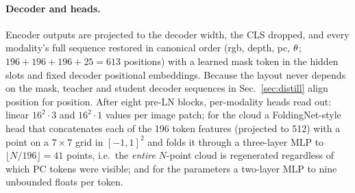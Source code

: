 \paragraph{Decoder and heads.}
Encoder outputs are projected to the decoder width, the CLS dropped, and every
modality's full sequence restored in canonical order (rgb, depth, pc, $\theta$;
$196{+}196{+}196{+}25=613$ positions) with a learned mask token in the hidden
slots and fixed decoder positional embeddings. Because the layout never depends on
the mask, teacher and student decoder sequences in Sec.~\ref{sec:distill} align
position for position. After eight pre-LN blocks, per-modality heads read out:
linear $16^2\!\cdot\!3$ and $16^2\!\cdot\!1$ values per image patch; for the cloud a
FoldingNet-style head that concatenates each of the 196 token features (projected
to 512) with a point on a $7\times7$ grid in $[-1,1]^2$ and folds it through a
three-layer MLP to $\lfloor N/196\rfloor{=}41$ points, i.e.\ the \emph{entire}
$N$-point cloud is regenerated regardless of which PC tokens were visible; and for
the parameters a two-layer MLP to nine unbounded floats per token.

